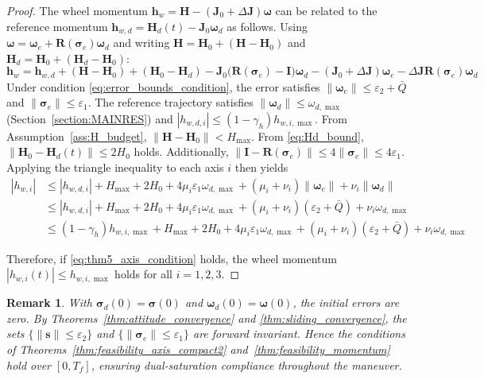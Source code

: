 \documentclass[journal]{new-aiaa}
\newtheorem{remark}{Remark}
\begin{document}
\begin{proof}
The wheel momentum $\boldsymbol{h}_w = \boldsymbol{H} - (\boldsymbol{J}_0+\Delta\boldsymbol{J})\boldsymbol{\omega}$ can be related to the reference momentum $\boldsymbol{h}_{w,d} = \boldsymbol{H}_d(t) - \boldsymbol{J}_0\boldsymbol{\omega}_d$ as follows.
Using $\boldsymbol{\omega} = \boldsymbol{\omega}_e + \boldsymbol{R}(\boldsymbol{\sigma}_e)\boldsymbol{\omega}_d$ and writing $\boldsymbol{H} = \boldsymbol{H}_0 + (\boldsymbol{H}-\boldsymbol{H}_0)$ and $\boldsymbol{H}_d = \boldsymbol{H}_0 + (\boldsymbol{H}_d-\boldsymbol{H}_0)$:
\[
\boldsymbol{h}_w = \boldsymbol{h}_{w,d} + (\boldsymbol{H} - \boldsymbol{H}_0) + (\boldsymbol{H}_0 - \boldsymbol{H}_d)
- \boldsymbol{J}_0\big(\boldsymbol{R}(\boldsymbol{\sigma}_e)-\boldsymbol{I}\big)\boldsymbol{\omega}_d
- (\boldsymbol{J}_0 + \Delta\boldsymbol{J})\boldsymbol{\omega}_e
- \Delta\boldsymbol{J}\boldsymbol{R}(\boldsymbol{\sigma}_e)\boldsymbol{\omega}_d
\]
Under condition \eqref{eq:error_bounds_condition}, the error satisfies $\|\boldsymbol{\omega}_e\| \le \varepsilon_2 + \bar Q$ and $\|\boldsymbol{\sigma}_e\| \le \varepsilon_1$.
The reference trajectory satisfies $\|\boldsymbol{\omega}_d\| \le \omega_{d,\max}$ (Section~\ref{section:MAINRES})
and $|h_{w,d,i}| \le (1 - \gamma_h) h_{w,i,\max}$.
From Assumption~\ref{ass:H_budget}, $\|\boldsymbol{H} - \boldsymbol{H}_0\| < H_{\max}$.
From \eqref{eq:Hd_bound}, $\|\boldsymbol{H}_0 - \boldsymbol{H}_d(t)\| \le 2H_0$ holds.
Additionally, $\|\boldsymbol{I} - \boldsymbol{R}(\boldsymbol{\sigma}_e)\| \le 4\|\boldsymbol{\sigma}_e\| \le 4\varepsilon_1$.
Applying the triangle inequality to each axis $i$ then yields
\begin{align}
  |h_{w,i}| &\le |h_{w,d,i}| + H_{\max} + 2H_0 + 4\mu_i\varepsilon_1\omega_{d,\max} + (\mu_i + \nu_i)\|\boldsymbol{\omega}_e\| + \nu_i\|\boldsymbol{\omega}_d\| \nonumber \\
  &\le |h_{w,d,i}| + H_{\max} + 2H_0 + 4\mu_i\varepsilon_1\omega_{d,\max} + (\mu_i + \nu_i) (\varepsilon_2 + \bar Q) + \nu_i \omega_{d,\max} \nonumber \\
  &\le (1 - \gamma_h) h_{w,i,\max} + H_{\max} + 2H_0 + 4\mu_i\varepsilon_1\omega_{d,\max} + (\mu_i + \nu_i) (\varepsilon_2 + \bar Q) + \nu_i \omega_{d,\max}
\end{align}

Therefore, if \eqref{eq:thm5_axis_condition} holds, the wheel momentum $|h_{w,i}(t)|\le h_{w,i,\max}$ holds for all $i=1,2,3$.
\end{proof}


\begin{remark}
With $\boldsymbol{\sigma}_d(0)=\boldsymbol{\sigma}(0)$ and $\boldsymbol{\omega}_d(0)=\boldsymbol{\omega}(0)$,
the initial errors are zero.
By Theorems~\ref{thm:attitude_convergence} and \ref{thm:sliding_convergence},
the sets $\{\|\boldsymbol{s}\|\le\varepsilon_2\}$ and $\{\|\boldsymbol{\sigma}_e\|\le\varepsilon_1\}$
are forward invariant.
Hence the conditions of Theorems~\ref{thm:feasibility_axis_compact2}
and~\ref{thm:feasibility_momentum} hold over $[0,T_f]$,
ensuring dual-saturation compliance throughout the maneuver.
\end{remark}
\end{document}
